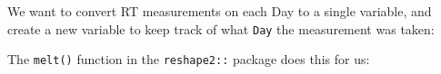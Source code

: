 \documentclass[]{article}
\newenvironment{Shaded}{\begin{snugshade}}{\end{snugshade}}
\newcommand{\DataTypeTok}[1]{\textcolor[rgb]{0.13,0.29,0.53}{#1}}
\newcommand{\DecValTok}[1]{\textcolor[rgb]{0.00,0.00,0.81}{#1}}
\newcommand{\KeywordTok}[1]{\textcolor[rgb]{0.13,0.29,0.53}{\textbf{#1}}}
\newcommand{\NormalTok}[1]{#1}
\newcommand{\OperatorTok}[1]{\textcolor[rgb]{0.81,0.36,0.00}{\textbf{#1}}}
\newcommand{\StringTok}[1]{\textcolor[rgb]{0.31,0.60,0.02}{#1}}
\begin{document}
We want to convert RT measurements on each Day to a single variable, and create
a new variable to keep track of what \texttt{Day} the measurement was taken:

The \texttt{melt()} function in the \texttt{reshape2::} package does this for us:

\begin{Shaded}
\end{Shaded}
\end{document}
